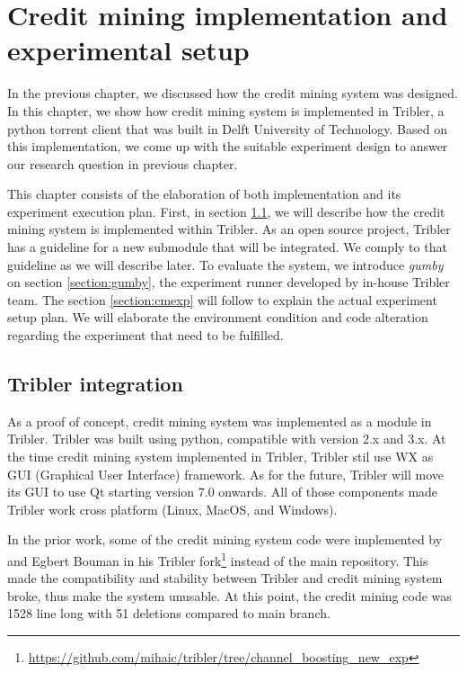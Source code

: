 \chapter{Credit mining implementation and experimental setup}
\label{chp:implexperiment}
In the previous chapter, we discussed how the credit mining system was designed. In this chapter, we show how credit mining system is implemented in Tribler, a python torrent client that was built in Delft University of Technology. Based on this implementation, we come up with the suitable experiment design to answer our research question in previous chapter. 

This chapter consists of the elaboration of both implementation and its experiment execution plan. First, in section \ref{section:triblerintregration}, we will describe how the credit mining system is implemented within Tribler. As an open source project, Tribler has a guideline for a new submodule that will be integrated. We comply to that guideline as we will describe later. To evaluate the system, we introduce \textit{gumby} on section \ref{section:gumby}, the experiment runner developed by in-house Tribler team. The section \ref{section:cmexp} will follow to explain the actual experiment setup plan. We will elaborate the environment condition and code alteration regarding the experiment that need to be fulfilled.

\section{Tribler integration}
\label{section:triblerintregration}
As a proof of concept, credit mining system was implemented as a module in Tribler. Tribler was built using python, compatible with version 2.x and 3.x. At the time credit mining system implemented in Tribler, Tribler stil use WX as GUI (Graphical User Interface) framework. As for the future, Tribler will move its GUI to use Qt starting version 7.0 onwards. All of those components made Tribler work cross platform (Linux, MacOS, and Windows).

In the prior work, some of the credit mining system code were implemented by \citeauthor{2015:creditmining:capota} and Egbert Bouman in his Tribler fork\footnote{\url{https://github.com/mihaic/tribler/tree/channel_boosting_new_exp}} instead of the main repository. This made the compatibility and stability between Tribler and credit mining system broke, thus make the system unusable. At this point, the credit mining code was 1528 line long with 51 deletions compared to main branch.

